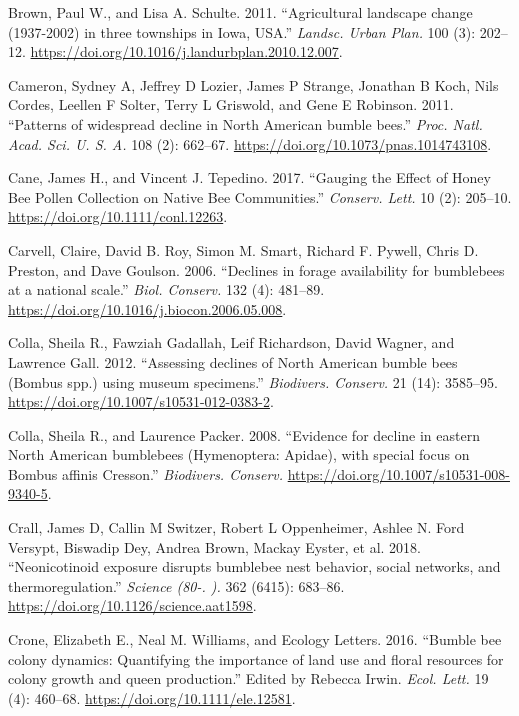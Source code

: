 \documentclass[11pt,]{article}
\begin{document}
\leavevmode\hypertarget{ref-Brown2011}{}%
Brown, Paul W., and Lisa A. Schulte. 2011. ``Agricultural landscape
change (1937-2002) in three townships in Iowa, USA.'' \emph{Landsc.
Urban Plan.} 100 (3): 202--12.
\url{https://doi.org/10.1016/j.landurbplan.2010.12.007}.

\leavevmode\hypertarget{ref-Cameron2011}{}%
Cameron, Sydney A, Jeffrey D Lozier, James P Strange, Jonathan B Koch,
Nils Cordes, Leellen F Solter, Terry L Griswold, and Gene E Robinson.
2011. ``Patterns of widespread decline in North American bumble bees.''
\emph{Proc. Natl. Acad. Sci. U. S. A.} 108 (2): 662--67.
\url{https://doi.org/10.1073/pnas.1014743108}.

\leavevmode\hypertarget{ref-Cane2017}{}%
Cane, James H., and Vincent J. Tepedino. 2017. ``Gauging the Effect of
Honey Bee Pollen Collection on Native Bee Communities.'' \emph{Conserv.
Lett.} 10 (2): 205--10. \url{https://doi.org/10.1111/conl.12263}.

\leavevmode\hypertarget{ref-Carvell2006b}{}%
Carvell, Claire, David B. Roy, Simon M. Smart, Richard F. Pywell, Chris
D. Preston, and Dave Goulson. 2006. ``Declines in forage availability
for bumblebees at a national scale.'' \emph{Biol. Conserv.} 132 (4):
481--89. \url{https://doi.org/10.1016/j.biocon.2006.05.008}.

\leavevmode\hypertarget{ref-Colla2012}{}%
Colla, Sheila R., Fawziah Gadallah, Leif Richardson, David Wagner, and
Lawrence Gall. 2012. ``Assessing declines of North American bumble bees
(Bombus spp.) using museum specimens.'' \emph{Biodivers. Conserv.} 21
(14): 3585--95. \url{https://doi.org/10.1007/s10531-012-0383-2}.

\leavevmode\hypertarget{ref-Colla2008}{}%
Colla, Sheila R., and Laurence Packer. 2008. ``Evidence for decline in
eastern North American bumblebees (Hymenoptera: Apidae), with special
focus on Bombus affinis Cresson.'' \emph{Biodivers. Conserv.}
\url{https://doi.org/10.1007/s10531-008-9340-5}.

\leavevmode\hypertarget{ref-Crall2018}{}%
Crall, James D, Callin M Switzer, Robert L Oppenheimer, Ashlee N. Ford
Versypt, Biswadip Dey, Andrea Brown, Mackay Eyster, et al. 2018.
``Neonicotinoid exposure disrupts bumblebee nest behavior, social
networks, and thermoregulation.'' \emph{Science (80-. ).} 362 (6415):
683--86. \url{https://doi.org/10.1126/science.aat1598}.

\leavevmode\hypertarget{ref-Crone2016}{}%
Crone, Elizabeth E., Neal M. Williams, and Ecology Letters. 2016.
``Bumble bee colony dynamics: Quantifying the importance of land use and
floral resources for colony growth and queen production.'' Edited by
Rebecca Irwin. \emph{Ecol. Lett.} 19 (4): 460--68.
\url{https://doi.org/10.1111/ele.12581}.
\end{document}
